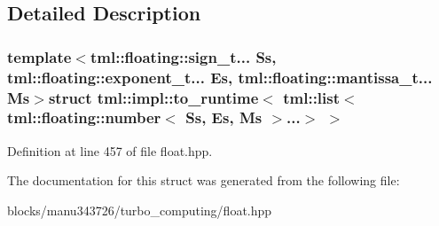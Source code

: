 \subsection{Detailed Description}
\subsubsection*{template$<$tml\+::floating\+::sign\+\_\+t... Ss, tml\+::floating\+::exponent\+\_\+t... Es, tml\+::floating\+::mantissa\+\_\+t... Ms$>$struct tml\+::impl\+::to\+\_\+runtime$<$ tml\+::list$<$ tml\+::floating\+::number$<$ Ss, Es, Ms $>$...$>$ $>$}



Definition at line 457 of file float.\+hpp.



The documentation for this struct was generated from the following file\+:\begin{DoxyCompactItemize}
\item 
blocks/manu343726/turbo\+\_\+computing/float.\+hpp\end{DoxyCompactItemize}
